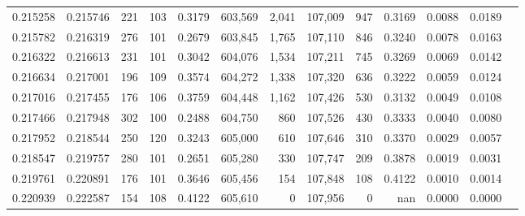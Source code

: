 \begin{tabular}{rrrrrrrrrrrrr}
0.215258 & 0.215746 &   221 & 103 &                                     0.3179 & 603,569 &   2,041 & 107,009 &     947 & 0.3169 & 0.0088 & 0.0189 \\
0.215782 & 0.216319 &   276 & 101 &                                     0.2679 & 603,845 &   1,765 & 107,110 &     846 & 0.3240 & 0.0078 & 0.0163 \\
0.216322 & 0.216613 &   231 & 101 &                                     0.3042 & 604,076 &   1,534 & 107,211 &     745 & 0.3269 & 0.0069 & 0.0142 \\
0.216634 & 0.217001 &   196 & 109 &                                     0.3574 & 604,272 &   1,338 & 107,320 &     636 & 0.3222 & 0.0059 & 0.0124 \\
0.217016 & 0.217455 &   176 & 106 &                                     0.3759 & 604,448 &   1,162 & 107,426 &     530 & 0.3132 & 0.0049 & 0.0108 \\
0.217466 & 0.217948 &   302 & 100 &                                     0.2488 & 604,750 &     860 & 107,526 &     430 & 0.3333 & 0.0040 & 0.0080 \\
0.217952 & 0.218544 &   250 & 120 &                                     0.3243 & 605,000 &     610 & 107,646 &     310 & 0.3370 & 0.0029 & 0.0057 \\
0.218547 & 0.219757 &   280 & 101 &                                     0.2651 & 605,280 &     330 & 107,747 &     209 & 0.3878 & 0.0019 & 0.0031 \\
0.219761 & 0.220891 &   176 & 101 &                                     0.3646 & 605,456 &     154 & 107,848 &     108 & 0.4122 & 0.0010 & 0.0014 \\
0.220939 & 0.222587 &   154 & 108 &                                     0.4122 & 605,610 &       0 & 107,956 &       0 &    nan & 0.0000 & 0.0000 \\
\bottomrule
\end{tabular}
